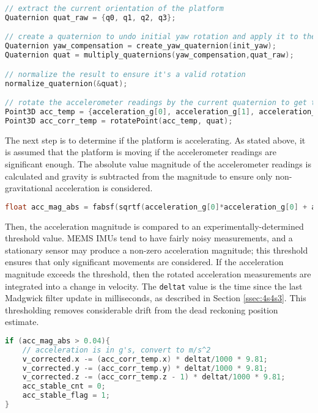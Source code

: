 \documentclass[11pt]{ucthesisCP}
\begin{document}
\begin{lstlisting}[language=C++]
// extract the current orientation of the platform
Quaternion quat_raw = {q0, q1, q2, q3};

// create a quaternion to undo initial yaw rotation and apply it to the current quaternion
Quaternion yaw_compensation = create_yaw_quaternion(init_yaw);
Quaternion quat = multiply_quaternions(yaw_compensation,quat_raw);

// normalize the result to ensure it's a valid rotation
normalize_quaternion(&quat);

// rotate the accelerometer readings by the current quaternion to get the acceleration from the sensor frame to the global frame
Point3D acc_temp = {acceleration_g[0], acceleration_g[1], acceleration_g[2]};
Point3D acc_corr_temp = rotatePoint(acc_temp, quat);
\end{lstlisting}

The next step is to determine if the platform is accelerating. As stated above, it is assumed that the platform is moving if the accelerometer readings are significant enough. The absolute value magnitude of the accelerometer readings is calculated and gravity is subtracted from the magnitude to ensure only non-gravitational acceleration is considered.

\begin{lstlisting}[language=C++]
float acc_mag_abs = fabsf(sqrtf(acceleration_g[0]*acceleration_g[0] + acceleration_g[1]*acceleration_g[1] + acceleration_g[2]*acceleration_g[2]) - 1);
\end{lstlisting}

Then, the acceleration magnitude is compared to an experimentally-determined threshold value. MEMS IMUs tend to have fairly noisy measurements, and a stationary sensor may produce a non-zero acceleration magnitude; this threshold ensures that only significant movements are considered. If the acceleration magnitude exceeds the threshold, then the rotated acceleration measurements are integrated into a change in velocity. The \verb|deltat| value is the time since the last Madgwick filter update in milliseconds, as described in Section \ref{ssec:4s4s3}. This thresholding removes considerable drift from the dead reckoning position estimate.

\begin{lstlisting}[language=C++]
if (acc_mag_abs > 0.04){
	// acceleration is in g's, convert to m/s^2
	v_corrected.x -= (acc_corr_temp.x) * deltat/1000 * 9.81; 
	v_corrected.y -= (acc_corr_temp.y) * deltat/1000 * 9.81;
	v_corrected.z -= (acc_corr_temp.z - 1) * deltat/1000 * 9.81;
	acc_stable_cnt = 0;
	acc_stable_flag = 1;
}
\end{lstlisting}
\end{document}
